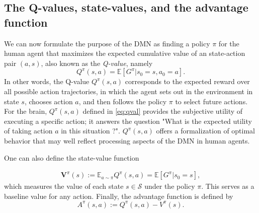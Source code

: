 \documentclass[10pt,letterpaper]{article}
\def\V{\mathbf{V}}
\begin{document}
\subsection{The Q-values, state-values, and the advantage function}
We can now formulate the purpose of the DMN
as finding a policy $\pi$ for the human agent that maximizes the
expected cumulative value of an state-action pair $(a,s)$, also known as the \textit{Q-value}, namely
\begin{equation}
  \label{eq:qval}
  Q^{\pi}(s,a) = \mathbb E [G^\pi|s_0=s,a_0=a].
\end{equation}
In other words,
the Q-value $Q^{\pi}(s,a)$ corresponds to the expected reward
over all possible action trajectories, in which
the agent sets out in the environment in state
$s$, chooses action $a$,
and then follows the policy $\pi$ to select future actions.
For the brain,
$Q^{\pi}(s, a)$ defined in \eqref{eq:qval} provides the subjective
utility of executing a specific action; it answers the question
"What is the expected utility of taking action $a$ in this situation ?".
$Q^{\pi}(s,a)$ offers a formalization of optimal behavior that
may well reflect processing aspects of the DMN in human agents.

One can also define the state-value function

\begin{eqnarray}
  \V^\pi(s) := \mathbb E_{a \sim \pi}Q^\pi(s,a) = \mathbb E [G^\pi|s_0=s],
\end{eqnarray}
which measures the value of each state $s \in \mathcal S$ under the policy $\pi$. This serves
as a baseline value for any action. Finally, the advantage function is defined by
\begin{equation}
A^\pi(s,a) :=  Q^\pi(s,a) - V^\pi(s).
\end{equation}

\end{document}
